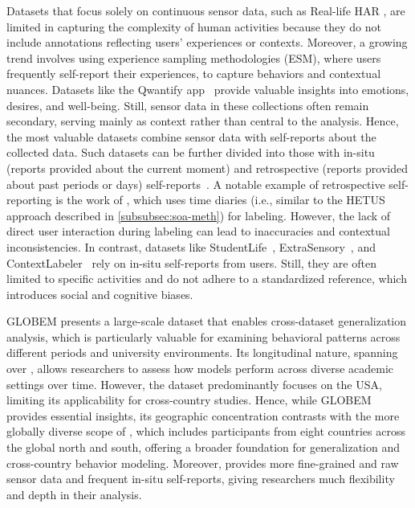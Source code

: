 Datasets that focus solely on continuous sensor data, such as Real-life HAR \cite{gonzalez2020}, are limited in capturing the complexity of human activities because they do not include annotations reflecting users' experiences or contexts. Moreover, a growing trend involves using experience sampling methodologies (ESM), where users frequently self-report their experiences, to capture behaviors and contextual nuances. Datasets like the Qwantify app~\cite{wilson2022qwantify} provide valuable insights into emotions, desires, and well-being. Still, sensor data in these collections often remain secondary, serving mainly as context rather than central to the analysis. Hence, the most valuable datasets combine sensor data with self-reports about the collected data. Such datasets can be further divided into those with in-situ (reports provided about the current moment) and retrospective (reports provided about past periods or days) self-reports~\cite{meegahapola2020smartphone}. A notable example of retrospective self-reporting is the work of \citet{krumm2013placer}, which uses time diaries (i.e., similar to the HETUS approach described in \cref{subsubsec:soa-meth}) for labeling. However, the lack of direct user interaction during labeling can lead to inaccuracies and contextual inconsistencies. In contrast, datasets like StudentLife~\cite{wang2014studentlife}, ExtraSensory~\cite{vaizman2017recognizing}, and ContextLabeler~\cite{campana2021contextlabeler} rely on in-situ self-reports from users. Still, they are often limited to specific activities and do not adhere to a standardized reference, which introduces social and cognitive biases.

GLOBEM \cite{xu2023globem} presents a large-scale dataset that enables cross-dataset generalization analysis, which is particularly valuable for examining behavioral patterns across different periods and university environments. Its longitudinal nature, spanning over , allows researchers to assess how models perform across diverse academic settings over time. However, the dataset predominantly focuses on the USA, limiting its applicability for cross-country studies. Hence, while GLOBEM provides essential insights, its geographic concentration contrasts with the more globally diverse scope of \dataset, which includes participants from eight countries across the global north and south, offering a broader foundation for generalization and cross-country behavior modeling. Moreover, \dataset provides more fine-grained and raw sensor data and frequent in-situ self-reports, giving researchers much flexibility and depth in their analysis. 

